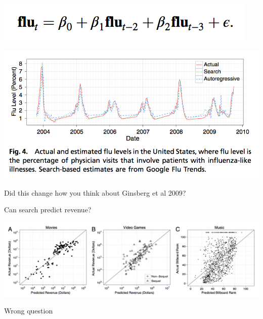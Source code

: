 \documentclass[aspectratio=169]{beamer}
\def\vf{\vfill}
\begin{document}
\begin{frame}

\begin{center}
\includegraphics[width=\textwidth]{figures/goel_predicting_2010_flu}
\end{center}

\end{frame}
\begin{frame}

\begin{center}
\includegraphics[width=\textwidth]{figures/goel_predicting_2010_fig4}
\end{center}

\end{frame}
\begin{frame}

{\Large
\begin{center}
Did this change how you think about Ginsberg et al 2009?
\end{center}
}

\end{frame}
\begin{frame}

Can search predict revenue?
\begin{center}
\includegraphics[width=\textwidth]{figures/goel_predicting_2010_fig2a-c}
\end{center}
\vf
Wrong question

\end{frame}
\end{document}
